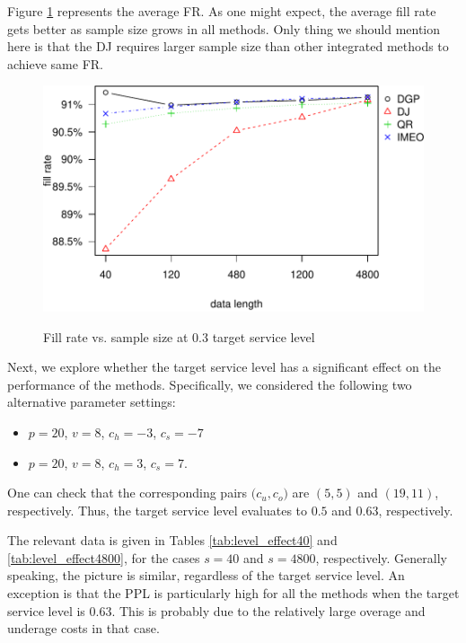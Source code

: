 \documentclass{article}
\begin{document}
Figure \ref{fig:fr0.3} represents the average FR. As one might expect, the average fill rate gets better as sample size grows in all methods. Only thing we should mention here is that the DJ requires larger sample size than other integrated methods to achieve same FR.


\begin{figure}[ht]
\centering
\caption{Fill rate vs. sample size at 0.3 target service level}
\includegraphics{linear-norm-plot_files/figure-latex/fr-3.pdf}
\label{fig:fr0.3}
\end{figure}

Next, we explore whether the target service level has a significant effect on the performance of the methods. Specifically, we considered the following two alternative parameter settings:
\begin{itemize}
    \item $p=20$, $v=8$, $c_h=-3$, $c_s=-7$
    \item $p=20$, $v=8$, $c_h=3$, $c_s=7$.
\end{itemize}
One can check that the corresponding pairs $\big( c_u,c_o \big)$ are $(5,5)$ and $(19,11)$, respectively. Thus, the target service level evaluates to $0.5$ and $0.63$, respectively.

The relevant data is given in Tables \ref{tab:level_effect40} and \ref{tab:level_effect4800}, for the cases $s=40$
and $s=4800$, respectively. Generally speaking, the picture is similar, regardless of the target service level. An exception is that the PPL is particularly high for all the methods when the target service level is 0.63. This is probably due to the relatively large overage and underage costs in that case.
\end{document}
